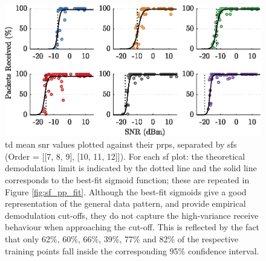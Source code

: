 \begin{figure}[H]
    \centering
   	\includegraphics{Figures/sf_pp_separate_plot}
    \caption[Plots of \ac{snr} vs \ac{prp}]{
   \ac{td} mean \ac{snr} values plotted against their \ac{prp}s, separated by \ac{sf}s (Order = [[7, 8, 9], [10, 11, 12]]). For each \ac{sf} plot: the theoretical demodulation limit is indicated by the dotted line and the solid line corresponds to the best-fit sigmoid function; these are repeated in Figure \ref{fig:sf_pp_fit}. Although the best-fit sigmoids give a good representation of the general data pattern, and provide empirical demodulation cut-offs, they do not capture the high-variance receive behaviour when approaching the cut-off. This is reflected by the fact that only 62\%, 60\%, 66\%, 39\%, 77\% and 82\% of the respective training points fall inside the corresponding 95\% confidence interval.
    }
    \label{fig:sf_pp_separate}
\end{figure}
\vspace{-0.5cm}
